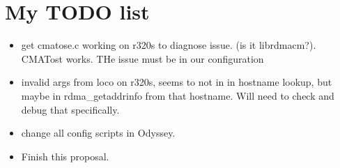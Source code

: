 \documentclass[sigplan,nonacm]{acmart}
\begin{document}
\section{My TODO list}
\begin{itemize}
    \item get cmatose.c working on r320s to diagnose issue. (is it librdmacm?). CMATost
    works. THe issue must be in our configuration
    \item invalid args from loco on r320s, seems to not in in hostname lookup, but maybe 
    in rdma_getaddrinfo from that hostname. Will need to check and debug that specifically.
    \item change all config scripts in Odyssey.
    \item Finish this proposal.
\end{itemize}


% 
% 
\end{document}
